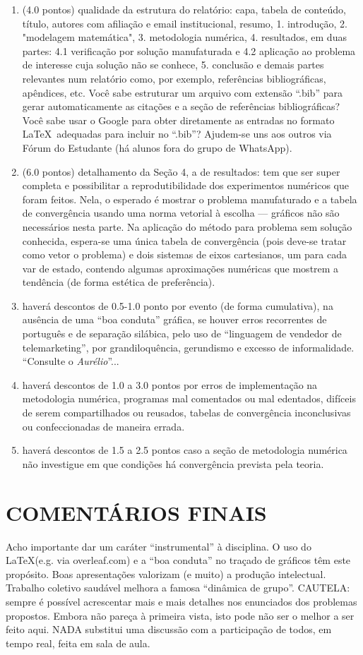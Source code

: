 \documentclass{article}
\begin{document}
\begin{enumerate}
  \item (4.0 pontos) qualidade da estrutura do relatório: capa, tabela de conteúdo, título, autores com afiliação e email institucional, resumo, 1. introdução, 2. "modelagem matemática", 3. metodologia numérica, 4. resultados, em duas partes: 4.1 verificação por solução manufaturada e 4.2 aplicação ao problema de interesse cuja solução não se conhece, 5. conclusão e demais partes relevantes num relatório como, por exemplo, referências bibliográficas, apêndices, etc. Você sabe estruturar um arquivo com extensão ``.bib'' para gerar automaticamente as citações e a seção de referências bi\-bliográficas? Você sabe usar o Google para obter diretamente as entradas  no formato \LaTeX\, adequadas para incluir no ``.bib''?  Ajudem-se uns aos outros via Fórum do Estudante (há alunos fora do grupo de WhatsApp).
  \item (6.0 pontos) detalhamento da Seção 4, a de resultados: tem que ser super completa e possibilitar a reprodutibilidade dos experimentos numéricos que foram feitos.  Nela,  o esperado é mostrar o problema manufaturado e a tabela de convergência usando uma norma vetorial à escolha --- gráficos não são necessários nesta parte. Na aplicação do método para problema sem solução conhecida, espera-se uma única tabela de convergência (pois deve-se tratar como vetor o problema) e dois sistemas de eixos cartesianos, um para cada var de estado, contendo algumas aproximações numéricas que mostrem a tendência (de forma estética de preferência). 
  \item haverá descontos de 0.5-1.0 ponto por evento (de forma cumulativa), na ausência de uma ``boa conduta'' gráfica, se houver erros recorrentes de português e de separação silábica, pelo uso de  ``linguagem de vendedor de telemarketing'', por grandiloquência, gerundismo e excesso de informalidade. ``Consulte o {\it Aurélio}''...
  \item haverá descontos de 1.0 a 3.0 pontos por erros de implementação na metodologia numérica, programas mal comentados ou mal edentados, difíceis de serem compartilhados ou reusados, tabelas de convergência inconclusivas ou confeccionadas de maneira errada.
  \item haverá descontos de 1.5 a 2.5 pontos caso a seção de metodologia numérica não investigue em que condições há convergência prevista pela teoria.
\end{enumerate}


\section{COMENTÁRIOS FINAIS}
    Acho importante dar um caráter ``instrumental'' à disciplina. O uso do \LaTeX\quad (e.g. via overleaf.com) e a ``boa conduta'' no traçado de gráficos têm este propósito. Boas apresentações valorizam (e muito) a produção intelectual. Trabalho coletivo saudável melhora a famosa ``dinâmica de grupo''. CAUTELA: sempre é possível acrescentar mais e mais detalhes nos enunciados dos problemas propostos. Embora não pareça à primeira vista, isto pode não ser o melhor a ser feito aqui. NADA substitui uma discussão com a participação de todos, em tempo real, feita em sala de aula.
    
\end{document}
